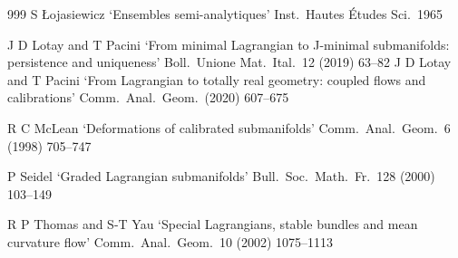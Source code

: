 \documentclass{article}
\theoremstyle{plain}%
\theoremstyle{definition}
\numberwithin{equation}{section}
\numberwithin{figure}{section}
\begin{document}
\begin{thebibliography}{999}
 S \L{}ojasiewicz
`Ensembles semi-analytiques'
Inst.\ Hautes \'Etudes Sci.\ 1965



J D Lotay and T Pacini
`From minimal Lagrangian to J-minimal submanifolds: persistence and uniqueness'
Boll.\ Unione Mat.\ Ital.\ 12 (2019) 63--82
J D Lotay and T Pacini
`From Lagrangian to totally real geometry: coupled flows and calibrations' Comm.\ Anal.\ Geom.\ (2020) 607--675

 R C McLean
`Deformations of calibrated submanifolds' Comm.\ Anal.\ Geom.\ 6 (1998) 705--747


 P Seidel
`Graded Lagrangian submanifolds'
Bull.\ Soc.\ Math.\ Fr.\ 128 (2000) 103--149

 R P Thomas and S-T Yau
`Special Lagrangians, stable bundles and mean curvature flow'
Comm.\ Anal.\ Geom.\ 10 (2002) 1075--1113

\end{thebibliography}
\end{document}
